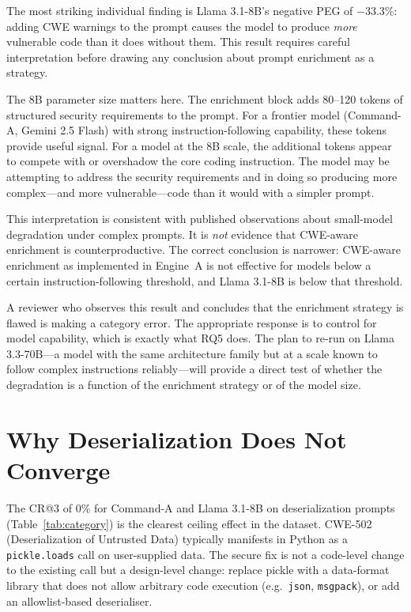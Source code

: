\documentclass[12pt,a4paper]{report}
\begin{document}
The most striking individual finding is Llama 3.1-8B's negative PEG of $-$33.3\%:
adding CWE warnings to the prompt causes the model to produce \emph{more}
vulnerable code than it does without them. This result requires careful
interpretation before drawing any conclusion about prompt enrichment as a strategy.

The 8B parameter size matters here. The enrichment block adds 80--120 tokens of
structured security requirements to the prompt. For a frontier model (Command-A,
Gemini 2.5 Flash) with strong instruction-following capability, these tokens
provide useful signal. For a model at the 8B scale, the additional tokens appear
to compete with or overshadow the core coding instruction. The model may be
attempting to address the security requirements and in doing so producing more
complex---and more vulnerable---code than it would with a simpler prompt.

This interpretation is consistent with published observations about small-model
degradation under complex prompts. It is \emph{not} evidence that CWE-aware
enrichment is counterproductive. The correct conclusion is narrower: CWE-aware
enrichment as implemented in Engine~A is not effective for models below a certain
instruction-following threshold, and Llama 3.1-8B is below that threshold.

A reviewer who observes this result and concludes that the enrichment strategy
is flawed is making a category error. The appropriate response is to control for
model capability, which is exactly what RQ5 does. The plan to re-run on Llama
3.3-70B---a model with the same architecture family but at a scale known to
follow complex instructions reliably---will provide a direct test of whether the
degradation is a function of the enrichment strategy or of the model size.

\section{Why Deserialization Does Not Converge}
\label{sec:discdeserial}

The CR@3 of 0\% for Command-A and Llama 3.1-8B on deserialization prompts
(Table~\ref{tab:category}) is the clearest ceiling effect in the dataset.
CWE-502 (Deserialization of Untrusted Data) typically manifests in Python as a
\texttt{pickle.loads} call on user-supplied data. The secure fix is not a
code-level change to the existing call but a design-level change: replace pickle
with a data-format library that does not allow arbitrary code execution (e.g.\
\texttt{json}, \texttt{msgpack}), or add an allowlist-based deserialiser.
\end{document}
